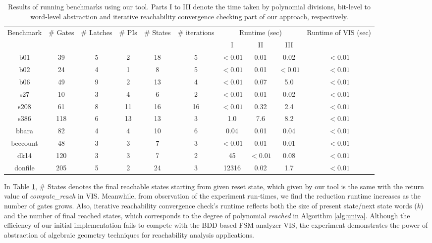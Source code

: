 \begin{table}[H]
\centering
\caption{Results of running benchmarks using our tool. 
\small{Parts I to III denote the time taken by polynomial divisions,
  bit-level to word-level abstraction and iterative reachability
  convergence checking part of our approach, respectively.}}
{\small 
\begin{tabular}{|c||c|c|c|c|c|c|c|c|c|}
\hline
\multirow{3}{*}{\centering Benchmark} 
& \multirow{3}{0.9cm}{\centering \# Gates} 
& \multirow{3}{1.1cm}{\centering \# Latches} 
& \multirow{3}{*}{\centering \# PIs}
 & \multirow{3}{0.9cm}{\centering \# States}
 & \multirow{3}{1.2cm}{\centering \# iterations}
 & \multicolumn{3}{c|}{\multirow{2}{2.0cm}{\centering Runtime (sec)}}
 & \multirow{3}{1.3cm}{\centering Runtime of VIS (sec)} \\
  & & & & & &\multicolumn{3}{c|}{}& \\
  \cline{7-9}
    & & & & & & I & II & III & \\
\hline
\hline
b01 & 39  & 5  & 2 & 18  & 5  & $<0.01$ & 0.01 & 0.02 & $<0.01$\\
b02 & 24  & 4  & 1 & 8 & 5 & $<0.01$  & 0.01 & $<0.01$ & $<0.01$ \\
b06 & 49  & 9  & 2 & 13 & 4 & $<0.01$ & 0.07 & 5.0 & $<0.01$ \\
s27 & 10 & 3 & 4 & 6 & 2 & $<0.01$ & 0.01 & 0.02  & $<0.01$  \\
s208 & 61 & 8 & 11 & 16 & 16 & $<0.01$ & 0.32 & 2.4 & $<0.01$ \\
s386 & 118 & 6 & 13 & 13  & 3 & 1.0 & 7.6 & 8.2  & $<0.01$ \\
bbara & 82 & 4 & 4 & 10 & 6 & 0.04 & 0.01 & 0.04  & $<0.01$ \\
beecount & 48  & 3  & 3 & 7  & 3  &$<0.01$ & 0.01 & 0.01 & $<0.01$ \\
dk14 & 120  & 3  & 3 & 7  & 2  & 45 & $<0.01$ & 0.08 & $<0.01$\\
donfile & 205  & 5  & 2 & 24 & 3  & 12316 & 0.02 & 1.7  & $<0.01$\\
\hline
\end{tabular}
}
\label{tab:recha_result}  
\end{table} 

In Table \ref{tab:recha_result}, \# States denotes the final reachable states
starting from given reset state, which given by our tool is the same with
the return value of {\it compute\_reach} in VIS. Meanwhile, from observation
of the experiment run-times, we find the reduction runtime increases
as the number of gates grows. Also, iterative reachability convergence
check's runtime reflects both the size of present state/next state
words ($k$) and the number of final reached states, which corresponds
to the degree of polynomial {\it reached} in Algorithm \ref{alg:univa}. 
Although the efficiency of our initial implementation fails to compete
with the BDD based FSM analyzer VIS, the experiment
demonstrates the power of abstraction of algebraic geometry techniques
for reachability analysis applications. 

